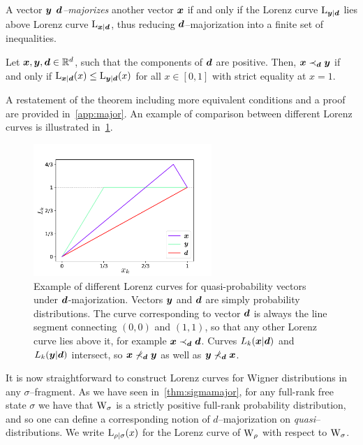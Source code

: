 \documentclass[pra,
aps,
twocolumn,
superscriptaddress,
groupedaddress,
nofootinbib,
reprint
]{revtex4-1}
\begin{document}
A vector $\bm{y}$ \emph{$\bm{d}$--majorizes} another vector $\bm{x}$ if and only if the Lorenz curve ${{\rm{L}}_{\bm{y}|\bm{d}}}$ lies above Lorenz curve ${{\rm{L}}_{\bm{x}|\bm{d}}}$, thus reducing $\bm{d}$--majorization into a finite set of inequalities.
\begin{theorem}\label{thm:dmajor}
    Let $\bm{x}, \bm{y}, \bm{d} \in \mathbb{R}^d$, such that the components of $\bm{d}$ are positive. 
    Then, $\bm{x} \prec_{\bm{d}} \bm{y}$ if and only if ${{\rm{L}}_{\bm{x}|\bm{d}}}(x) \leq {{\rm{L}}_{\bm{y}|\bm{d}}}(x)$ for all $x \in [0,1]$ with strict equality at $x=1$.
\end{theorem}
A restatement of the theorem including more equivalent conditions and a proof are provided in~\cref{app:major}.
An example of comparison between different Lorenz curves is illustrated in~\cref{fig:lctoy}.
\begin{figure}
    \centering
    \includegraphics[height=5cm]{figs/lctoy.pdf}
    \caption{Example of different Lorenz curves for quasi-probability vectors under $\bm{d}$-majorization.
    Vectors $\bm{y}$ and $\bm{d}$ are simply probability distributions.
    The curve corresponding to vector $\bm{d}$ is always the line segment connecting $(0,0)$ and $(1,1)$, so that any other Lorenz curve lies above it, for example $\bm{x} \prec_{\bm{d}} \bm{d}$.
    Curves $L_k(\bm{x}|\bm{d})$ and $L_k(\bm{y}|\bm{d})$ intersect, so $\bm{x} \nprec_{\bm{d}} \bm{y}$ as well as $\bm{y} \nprec_{\bm{d}} \bm{x}$.
    }
    \label{fig:lctoy}
\end{figure}

It is now straightforward to construct Lorenz curves for Wigner distributions in any $\sigma$--fragment.
As we have seen in~\cref{thm:sigmamajor}, for any full-rank free state $\sigma$ we have that $\W{\sigma}$ is a strictly positive full-rank probability distribution, and so one can define a corresponding notion of $d$--majorization on \emph{quasi}--distributions.
We write ${{\rm{L}}_{\rho|\sigma}}(x)$ for the Lorenz curve of $\W{\rho}$ with respect to $\W{\sigma}$.
\end{document}
